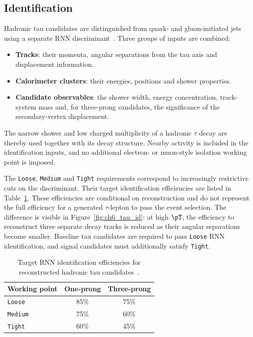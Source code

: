 \subsection{Identification}

Hadronic tau candidates are distinguished from quark- and gluon-initiated jets using a separate RNN discriminant~\cite{ATLAS2019TauRNN,ATLAS2022TauR22}.
Three groups of inputs are combined:
\begin{itemize}
    \item \textbf{Tracks}: their momenta, angular separations from the tau axis and displacement information.
    \item \textbf{Calorimeter clusters}: their energies, positions and shower properties.
    \item \textbf{Candidate observables}: the shower width, energy concentration, track-system mass and, for three-prong candidates, the significance of the secondary-vertex displacement.
\end{itemize}
The narrow shower and low charged multiplicity of a hadronic $\tau$ decay are thereby used together with its decay structure.
Nearby activity is included in the identification inputs, and no additional electron- or muon-style isolation working point is imposed.

The \texttt{Loose}, \texttt{Medium} and \texttt{Tight} requirements correspond to increasingly restrictive cuts on the discriminant.
Their target identification efficiencies are listed in Table~\ref{tab:ch6_tau_id}.
These efficiencies are conditional on reconstruction and do not represent the full efficiency for a generated $\tau$-lepton to pass the event selection.
The difference is visible in Figure~\ref{fig:ch6_tau_id}: at high $\pT$, the efficiency to reconstruct three separate decay tracks is reduced as their angular separations become smaller.
Baseline tau candidates are required to pass \texttt{Loose} RNN identification, and signal candidates must additionally satisfy \texttt{Tight}.

\begin{table}[htbp]
    \centering
    \caption[Target efficiencies of the hadronic tau identification working points]{Target RNN identification efficiencies for reconstructed hadronic tau candidates~\cite{ATLAS2022TauR22}.}
    \label{tab:ch6_tau_id}
    \begin{tabular}{lcc}
        \toprule
        Working point & One-prong & Three-prong \\
        \midrule
        \texttt{Loose} & 85\% & 75\% \\
        \texttt{Medium} & 75\% & 60\% \\
        \texttt{Tight} & 60\% & 45\% \\
        \bottomrule
    \end{tabular}
\end{table}


